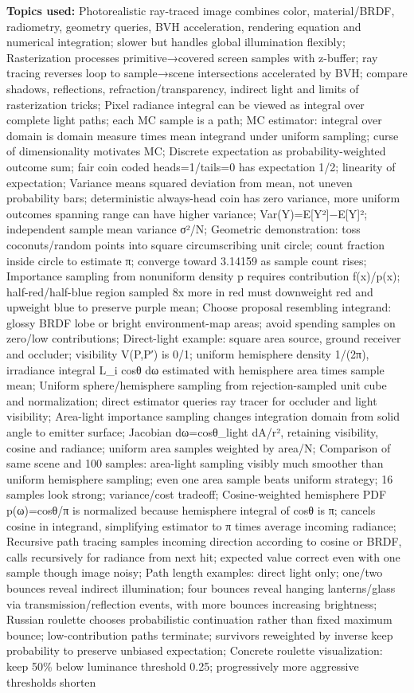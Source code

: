 \textbf{Topics used:} Photorealistic ray-traced image combines color, material/BRDF, radiometry, geometry queries, BVH acceleration, rendering equation and numerical integration; slower but handles global illumination flexibly; Rasterization processes primitive→covered screen samples with z-buffer; ray tracing reverses loop to sample→scene intersections accelerated by BVH; compare shadows, reflections, refraction/transparency, indirect light and limits of rasterization tricks; Pixel radiance integral can be viewed as integral over complete light paths; each MC sample is a path; MC estimator: integral over domain is domain measure times mean integrand under uniform sampling; curse of dimensionality motivates MC; Discrete expectation as probability-weighted outcome sum; fair coin coded heads=1/tails=0 has expectation 1/2; linearity of expectation; Variance means squared deviation from mean, not uneven probability bars; deterministic always-head coin has zero variance, more uniform outcomes spanning range can have higher variance; Var(Y)=E{[}Y²{]}−E{[}Y{]}²; independent sample mean variance σ²/N; Geometric demonstration: toss coconuts/random points into square circumscribing unit circle; count fraction inside circle to estimate π; converge toward 3.14159 as sample count rises; Importance sampling from nonuniform density p requires contribution f(x)/p(x); half-red/half-blue region sampled 8x more in red must downweight red and upweight blue to preserve purple mean; Choose proposal resembling integrand: glossy BRDF lobe or bright environment-map areas; avoid spending samples on zero/low contributions; Direct-light example: square area source, ground receiver and occluder; visibility V(P,P′) is 0/1; uniform hemisphere density 1/(2π), irradiance integral L\_i cosθ dω estimated with hemisphere area times sample mean; Uniform sphere/hemisphere sampling from rejection-sampled unit cube and normalization; direct estimator queries ray tracer for occluder and light visibility; Area-light importance sampling changes integration domain from solid angle to emitter surface; Jacobian dω=cosθ\_light dA/r², retaining visibility, cosine and radiance; uniform area samples weighted by area/N; Comparison of same scene and 100 samples: area-light sampling visibly much smoother than uniform hemisphere sampling; even one area sample beats uniform strategy; 16 samples look strong; variance/cost tradeoff; Cosine-weighted hemisphere PDF p(ω)=cosθ/π is normalized because hemisphere integral of cosθ is π; cancels cosine in integrand, simplifying estimator to π times average incoming radiance; Recursive path tracing samples incoming direction according to cosine or BRDF, calls recursively for radiance from next hit; expected value correct even with one sample though image noisy; Path length examples: direct light only; one/two bounces reveal indirect illumination; four bounces reveal hanging lanterns/glass via transmission/reflection events, with more bounces increasing brightness; Russian roulette chooses probabilistic continuation rather than fixed maximum bounce; low-contribution paths terminate; survivors reweighted by inverse keep probability to preserve unbiased expectation; Concrete roulette visualization: keep 50\% below luminance threshold 0.25; progressively more aggressive thresholds shorten 
